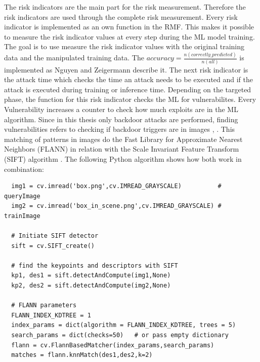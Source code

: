 The risk indicators are the main part for the risk measurement. Therefore the risk indicators are used through the complete risk measurement. Every risk indicator is implemented as an own
function in the RMF. This makes it possible to measure the risk indicator values at every step during the ML model training. The goal is to use measure the risk indicator values with the
original training data and the manipulated training data. The $accuracy=\frac{n(correctly\_predicted)}{n(all)}$ is implemented as Nguyen and Zeigermann \cite{9783960101925} describe it.
The next risk indicator is the attack time which checks the time an attack needs to be executed and if the attack is executed during training or inference time. Depending on the targeted phase, the function for this risk indicator checks the ML for vulnerabilites. Every Vulnerability increases a counter to check how much exploits are in the ML algorithm. Since in this thesis only backdoor attacks are performed, finding vulnerabilities refers to checking if backdoor triggers are in images \cite{DBLP:journals/corr/abs-1708-06733}, \cite{DBLP:journals/corr/abs-1907-07296}. This matching of patterns in images do the Fast Library for Approximate Nearest Neighbors (FLANN) \cite{DBLP:journals/corr/FuC16} in relation with the Scale Invariant Feature Transform (SIFT) algorithm \cite{Songtao2017AnIM}. The following Python algorithm shows how both work in combination: \\

\begin{lstlisting}
  img1 = cv.imread('box.png',cv.IMREAD_GRAYSCALE)          # queryImage
  img2 = cv.imread('box_in_scene.png',cv.IMREAD_GRAYSCALE) # trainImage

  # Initiate SIFT detector
  sift = cv.SIFT_create()

  # find the keypoints and descriptors with SIFT
  kp1, des1 = sift.detectAndCompute(img1,None)
  kp2, des2 = sift.detectAndCompute(img2,None)

  # FLANN parameters
  FLANN_INDEX_KDTREE = 1
  index_params = dict(algorithm = FLANN_INDEX_KDTREE, trees = 5)
  search_params = dict(checks=50)   # or pass empty dictionary
  flann = cv.FlannBasedMatcher(index_params,search_params)
  matches = flann.knnMatch(des1,des2,k=2)
\end{lstlisting}

